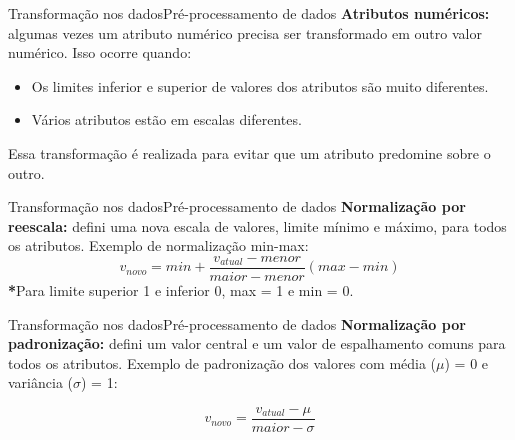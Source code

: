 \documentclass[t]{beamer}
\begin{document}
\begin{ftst}{Transformação nos dados}{Pré-processamento de dados}
\justifying
\textbf{Atributos numéricos:} algumas vezes um atributo numérico precisa ser transformado em outro valor numérico. Isso ocorre quando:
\vone

\begin{itemize}
    \item Os limites inferior e superior de valores dos atributos são muito diferentes.
    \item Vários atributos estão em escalas diferentes.
\end{itemize}
\vone
Essa transformação é realizada para evitar que um atributo predomine sobre o outro.

\end{ftst}


\begin{ftst}{Transformação nos dados}{Pré-processamento de dados}
\justifying
\textbf{Normalização por reescala:} defini uma nova escala de valores, limite mínimo e máximo, para todos os atributos.
\vone
Exemplo de normalização min-max:
\begin{equation}
    v_{novo} = min + \frac{v_{atual}- menor}{maior - menor}(max-min)
\end{equation}
\vone
\textbf{*}Para limite superior 1 e inferior 0, max = 1 e min = 0.

\end{ftst}


\begin{ftst}{Transformação nos dados}{Pré-processamento de dados}
\justifying
\textbf{Normalização por padronização:} defini um valor central e um valor de espalhamento comuns para todos os atributos.
\vone
Exemplo de padronização dos valores com média ($\mu$) = 0 e variância ($\sigma$) = 1:

\begin{equation}
    v_{novo} = \frac{v_{atual}- \mu}{maior - \sigma}
\end{equation}


\end{ftst}

\end{document}
